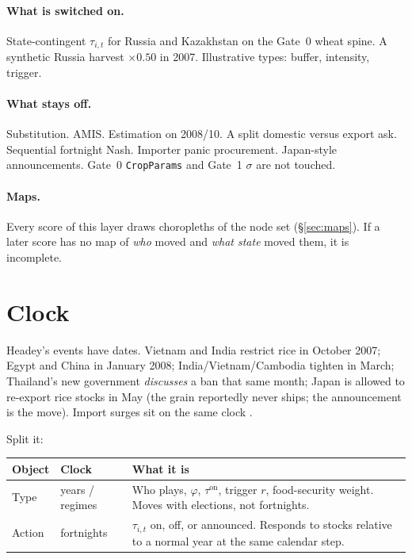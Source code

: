 \documentclass[11pt,a4paper]{article}
\begin{document}
\paragraph{What is switched on.}
State-contingent \(\tau_{i,t}\) for Russia and Kazakhstan on the Gate~0
wheat spine. A synthetic Russia harvest \(\times 0.50\) in 2007.
Illustrative types: buffer, intensity, trigger.

\paragraph{What stays off.}
Substitution. AMIS. Estimation on 2008/10. A split domestic versus export
ask. Sequential fortnight Nash. Importer panic procurement. Japan-style
announcements. Gate~0 \texttt{CropParams} and Gate~1 \(\sigma\) are not
touched.

\paragraph{Maps.}
Every score of this layer draws choropleths of the node set
(\S\ref{sec:maps}). If a later score has no map of \emph{who} moved and
\emph{what state} moved them, it is incomplete.

\section{Clock}
\label{sec:clock}

Headey's events have dates. Vietnam and India restrict rice in October 2007;
Egypt and China in January 2008; India/Vietnam/Cambodia tighten in March;
Thailand's new government \emph{discusses} a ban that same month; Japan is
allowed to re-export rice stocks in May (the grain reportedly never ships;
the announcement is the move). Import surges sit on the same clock
\citep{headey2011,martin2012,wright2011}.

Split it:

\begin{center}
\small
\begin{tabular}{llp{}}
\toprule
Object & Clock & What it is \\
\midrule
Type & years / regimes & Who plays, \(\varphi\), \(\tau^{\mathrm{on}}\),
trigger \(r\), food-security weight. Moves with elections, not fortnights. \\
Action & fortnights & \(\tau_{i,t}\) on, off, or announced. Responds to
stocks relative to a normal year at the same calendar step. \\
\bottomrule
\end{tabular}
\end{center}
\end{document}
